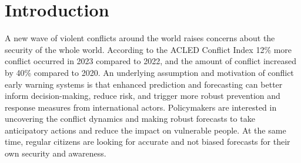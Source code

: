 \documentclass[runningheads]{llncs}
\begin{document}
    \section{Introduction}

    A new wave of violent conflicts around the world raises concerns about the security of the whole world. According to the ACLED Conflict Index 12\% more conflict occurred in 2023 compared to 2022, and the amount of conflict increased by 40\% compared to 2020. An underlying assumption and motivation of conflict early warning systems is that enhanced prediction and forecasting can better inform decision-making, reduce risk, and trigger more robust prevention and response measures from international actors. Policymakers are interested in uncovering the conflict dynamics and making robust forecasts to take anticipatory actions and reduce the impact on vulnerable people. At the same time, regular citizens are looking for accurate and not biased forecasts for their own security and awareness.


\end{document}
